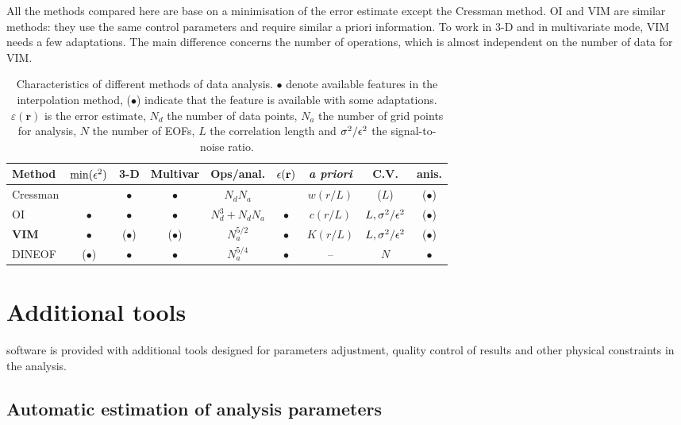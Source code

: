 All the methods compared here are base on a minimisation of the error estimate except the Cressman method. OI and VIM are similar methods: they use the same control parameters and require similar a priori information. To work in 3-D and in multivariate mode, VIM needs a few adaptations. 
The main difference concerns the number of operations, which is almost independent on the number of data for VIM.

\begin{table}[htpb]
\caption{Characteristics of different methods of data analysis. $\bullet$ denote available features in the interpolation method, ($\bullet$) indicate that the feature is available with some adaptations. $\varepsilon(\mathbf{r})$ is the error estimate, $N_d$ the number of data points, $N_a$ the number of grid points for analysis, $N$ the number of EOFs, $L$ the correlation length and $\sigma^2/ \epsilon^2$ the signal-to-noise ratio.\label{tabdata}}
\begin{tabular*}{0.99\textwidth}{@{\extracolsep{\fill}}lcccccccc}
\toprule
Method   & $\min(\epsilon^2)$	& 3-D       & Multivar & Ops/anal.        & $\epsilon(\mathbf{r})$& \textit{a priori}& C.V. & anis. \\ 
\midrule
Cressman &              	& $\bullet$& $\bullet$& $N_d N_a$        &                & $w(r/L)$   &($L$) & ($\bullet$) 			\\ 
OI    	 &   $\bullet$    	& $\bullet$& $\bullet$& $N_d^3+ N_d N_a$ & $\bullet$      & $c(r/L)$   & $L,\sigma^2/\epsilon^2$&($\bullet$)	\\ 
{\bf VIM}&   $\bullet$      &($\bullet$)& ($\bullet$)& $N_a^{5/2}$   & $\bullet$      & $K(r/L)$   & $L,\sigma^2/\epsilon^2$&($\bullet$)	\\
DINEOF   &  ($\bullet$)     & $\bullet$ &  $\bullet$ & $N_a^{5/4}$   & $\bullet$  	  &  --		   & $N$               & $\bullet$	\\ 
\bottomrule
\end{tabular*}
\end{table}

\section{Additional tools}

\diva software is provided with additional tools designed for parameters adjustment, quality control of results and other physical constraints in the analysis.

\subsection{Automatic estimation of analysis parameters}

